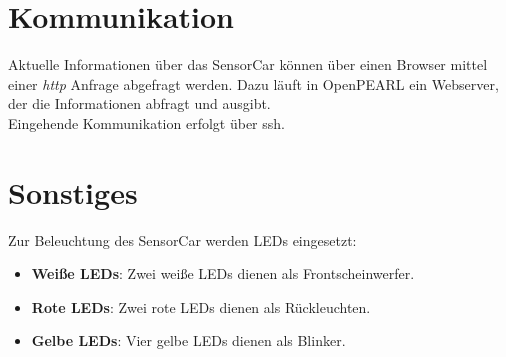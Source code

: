 \section{Kommunikation}
Aktuelle Informationen über das SensorCar können über einen Browser mittel einer \emph{http} Anfrage abgefragt werden. Dazu läuft in OpenPEARL ein Webserver, der die Informationen abfragt und ausgibt.\\
Eingehende Kommunikation erfolgt über ssh.

\section{Sonstiges}
Zur Beleuchtung des SensorCar werden LEDs eingesetzt:
\begin{itemize}
	\item \textbf{Weiße LEDs}: Zwei weiße LEDs dienen als Frontscheinwerfer.
	\item \textbf{Rote LEDs}: Zwei rote LEDs dienen als Rückleuchten.
	\item \textbf{Gelbe LEDs}: Vier gelbe LEDs dienen als Blinker.
\end{itemize}




